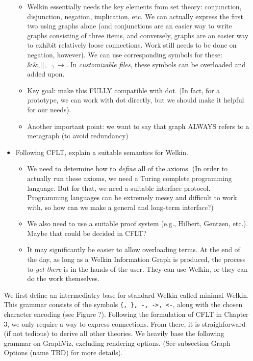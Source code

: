 \begin{itemize}
\begin{itemize}
			            \item Welkin essentially needs the key elements from set theory: conjunction, disjunction, negation, implication, etc. We can actually express the first two using graphs alone (and conjunctions are an easier way to write graphs consisting of three items, and conversely, graphs are an easier way to exhibit relatively loose connections. Work still needs to be done on negation, however). We can use corresponding symbols for these: $\&\&, ||, \neg, \rightarrow$. In \textit{customizable files}, these symbols can be overloaded and added upon.
			            \item Key goal: make this FULLY compatible with dot. (In fact, for a prototype, we can work with dot directly, but we should make it helpful for our needs).
									\item Another important point: we want to say that graph ALWAYS refers to a metagraph (to avoid redundancy)		            \end{itemize}
	\item Following CFLT, explain a suitable semantics for Welkin.
	      \begin{itemize}
		      \item We need to determine how to \textit{define} all of the axioms. (In order to actually run these axioms, we need a Turing complete programming language. But for that, we need a suitable interface protocol. Programming languages can be extremely messy and difficult to work with, so how can we make a general and long-term interface?)
			\item We also need to use a suitable proof system (e.g., Hilbert, Gentzen, etc.). Maybe that could be decided in CFLT?
			\item It may significantly be easier to allow overloading terms. At the end of the day, as long as a Welkin Information Graph is produced, the process to \textit{get there} is in the hands of the user. They can use Welkin, or they can do the work themselves.
	      \end{itemize}
\end{itemize}

We first define an intermediatry base for standard Welkin called minimal Welkin. This grammar consists of the symbols \texttt{\{, \}, -, ->, <-}, along with the chosen character encoding (see Figure ?). Following the formulation of CFLT in Chapter 3, we only require a way to express connections. From there, it is straighforward (if not tedious) to derive all other theories. We heavily base the following grammar on GraphViz, excluding rendering options. (See subsection Graph Options (name TBD) for more details).

